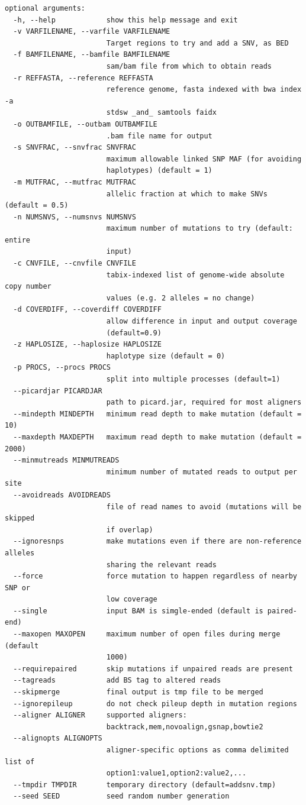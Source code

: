 \documentclass[letterpaper,11pt]{article}
\begin{document}
\begin{verbatim}
optional arguments:
  -h, --help            show this help message and exit
  -v VARFILENAME, --varfile VARFILENAME
                        Target regions to try and add a SNV, as BED
  -f BAMFILENAME, --bamfile BAMFILENAME
                        sam/bam file from which to obtain reads
  -r REFFASTA, --reference REFFASTA
                        reference genome, fasta indexed with bwa index -a
                        stdsw _and_ samtools faidx
  -o OUTBAMFILE, --outbam OUTBAMFILE
                        .bam file name for output
  -s SNVFRAC, --snvfrac SNVFRAC
                        maximum allowable linked SNP MAF (for avoiding
                        haplotypes) (default = 1)
  -m MUTFRAC, --mutfrac MUTFRAC
                        allelic fraction at which to make SNVs (default = 0.5)
  -n NUMSNVS, --numsnvs NUMSNVS
                        maximum number of mutations to try (default: entire
                        input)
  -c CNVFILE, --cnvfile CNVFILE
                        tabix-indexed list of genome-wide absolute copy number
                        values (e.g. 2 alleles = no change)
  -d COVERDIFF, --coverdiff COVERDIFF
                        allow difference in input and output coverage
                        (default=0.9)
  -z HAPLOSIZE, --haplosize HAPLOSIZE
                        haplotype size (default = 0)
  -p PROCS, --procs PROCS
                        split into multiple processes (default=1)
  --picardjar PICARDJAR
                        path to picard.jar, required for most aligners
  --mindepth MINDEPTH   minimum read depth to make mutation (default = 10)
  --maxdepth MAXDEPTH   maximum read depth to make mutation (default = 2000)
  --minmutreads MINMUTREADS
                        minimum number of mutated reads to output per site
  --avoidreads AVOIDREADS
                        file of read names to avoid (mutations will be skipped
                        if overlap)
  --ignoresnps          make mutations even if there are non-reference alleles
                        sharing the relevant reads
  --force               force mutation to happen regardless of nearby SNP or
                        low coverage
  --single              input BAM is simgle-ended (default is paired-end)
  --maxopen MAXOPEN     maximum number of open files during merge (default
                        1000)
  --requirepaired       skip mutations if unpaired reads are present
  --tagreads            add BS tag to altered reads
  --skipmerge           final output is tmp file to be merged
  --ignorepileup        do not check pileup depth in mutation regions
  --aligner ALIGNER     supported aligners:
                        backtrack,mem,novoalign,gsnap,bowtie2
  --alignopts ALIGNOPTS
                        aligner-specific options as comma delimited list of
                        option1:value1,option2:value2,...
  --tmpdir TMPDIR       temporary directory (default=addsnv.tmp)
  --seed SEED           seed random number generation

\end{verbatim}
\end{document}
